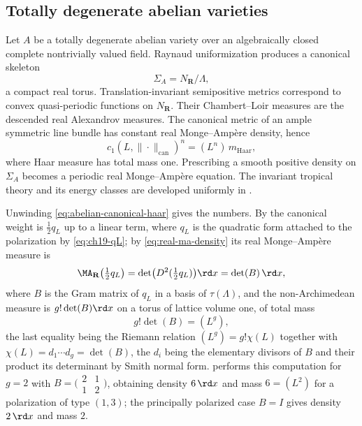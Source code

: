 \subsection{Totally degenerate abelian varieties}
\label{sec:ch31-abelian}

Let \(A\) be a totally degenerate abelian variety over an algebraically
closed complete nontrivially valued field.  Raynaud uniformization produces
a canonical skeleton
\[
                         \Sigma_A=N_\mathbf R/\Lambda,
\]
a compact real torus.  Translation-invariant semipositive metrics correspond
to convex quasi-periodic functions on \(N_\mathbf R\).  Their
Chambert--Loir measures are the descended real Alexandrov measures.  The
canonical metric of an ample symmetric line bundle has constant real
Monge--Amp\`ere density, hence
\begin{equation}
               c_1(L,\|\cdot\|_{\mathrm{can}})^n
               =(L^n)\,m_{\mathrm{Haar}},
\label{eq:abelian-canonical-haar}
\end{equation}
where Haar measure has total mass one.  Prescribing a smooth positive density
on \(\Sigma_A\) becomes a periodic real Monge--Amp\`ere equation.  The
invariant tropical theory and its energy classes are developed uniformly in
\cite{BGJKK25}.

Unwinding \eqref{eq:abelian-canonical-haar} gives the numbers.  By
 the canonical weight is
\(\tfrac12q_L\) up to a linear term, where \(q_L\) is the quadratic form
attached to the polarization by \eqref{eq:ch19-qL}; by
\eqref{eq:real-ma-density} its real Monge--Amp\`ere measure is
\begin{equation}
\label{eq:ch31-abelian-density}
 \MA_{\mathbf R}\bigl(\tfrac12q_L\bigr)
 =\det\bigl(D^2(\tfrac12q_L)\bigr)\rd x=\det(B)\,\rd x,
\end{equation}
where \(B\) is the Gram matrix of \(q_L\) in a basis of
\(\tau(\Lambda)\), and the non-Archimedean measure is \(g!\det(B)\rd x\) on a
torus of lattice volume one, of total mass
\begin{equation}
\label{eq:ch31-abelian-mass}
 g!\det(B)=(L^g),
\end{equation}
the last equality being the Riemann relation \((L^g)=g!\chi(L)\) together
with \(\chi(L)=d_1\cdots d_g=\det(B)\), the \(d_i\) being the elementary
divisors of \(B\) and their product its determinant by Smith normal form.
 performs this computation
for \(g=2\) with
\(B=\bigl(\begin{smallmatrix}2&1\\1&2\end{smallmatrix}\bigr)\), obtaining
density \(6\,\rd x\) and mass \(6=(L^2)\) for a polarization of type
\((1,3)\); the principally polarized case \(B=I\) gives density
\(2\,\rd x\) and mass \(2\).

